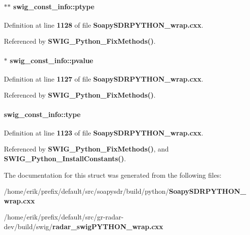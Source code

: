 \paragraph[{ptype}]{ $\ast$$\ast$ swig\+\_\+const\+\_\+info\+::ptype}\label{structswig__const__info_a374efde326bb281d91791c91306e3f08}


Definition at line {\bf 1128} of file {\bf Soapy\+S\+D\+R\+P\+Y\+T\+H\+O\+N\+\_\+wrap.\+cxx}.



Referenced by {\bf S\+W\+I\+G\+\_\+\+Python\+\_\+\+Fix\+Methods()}.

\paragraph[{pvalue}]{ $\ast$ swig\+\_\+const\+\_\+info\+::pvalue}\label{structswig__const__info_a37585059046a4951907eb779c97e7cc8}


Definition at line {\bf 1127} of file {\bf Soapy\+S\+D\+R\+P\+Y\+T\+H\+O\+N\+\_\+wrap.\+cxx}.



Referenced by {\bf S\+W\+I\+G\+\_\+\+Python\+\_\+\+Fix\+Methods()}.

\paragraph[{type}]{ swig\+\_\+const\+\_\+info\+::type}\label{structswig__const__info_ae8bbc99e1cda11f24e306365cbf33893}


Definition at line {\bf 1123} of file {\bf Soapy\+S\+D\+R\+P\+Y\+T\+H\+O\+N\+\_\+wrap.\+cxx}.



Referenced by {\bf S\+W\+I\+G\+\_\+\+Python\+\_\+\+Fix\+Methods()}, and {\bf S\+W\+I\+G\+\_\+\+Python\+\_\+\+Install\+Constants()}.



The documentation for this struct was generated from the following files\+:\begin{DoxyCompactItemize}
\item 
/home/erik/prefix/default/src/soapysdr/build/python/{\bf Soapy\+S\+D\+R\+P\+Y\+T\+H\+O\+N\+\_\+wrap.\+cxx}\item 
/home/erik/prefix/default/src/gr-\/radar-\/dev/build/swig/{\bf radar\+\_\+swig\+P\+Y\+T\+H\+O\+N\+\_\+wrap.\+cxx}\end{DoxyCompactItemize}
